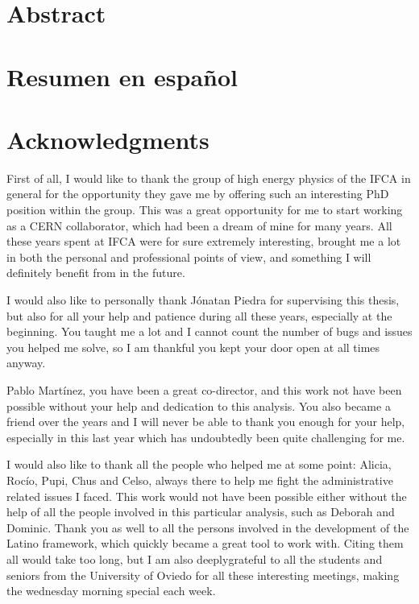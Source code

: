 \documentclass[a4paper, 10pt, openright]{report}
\begin{document}

\setlength{\parskip}{5pt}
\setcounter{page}{1}

\chapter*{\huge{Abstract}}
\newpage
%
\chapter*{\huge{Resumen en espa\~{n}ol}}
\newpage
%

\chapter*{\huge{Acknowledgments}}

\iffalse
First of all, I would like to thank the group of high energy physics of the \ac{IFCA} in general for the opportunity they gave me by offering such an interesting PhD position within the group. This was a great opportunity for me to start working as a CERN collaborator, which had been a dream of mine for many years. All these years spent at \ac{IFCA} were for sure extremely interesting, brought me a lot in both the personal and professional points of view, and something I will definitely benefit from in the future.

I would also like to personally thank J\'{o}natan Piedra for supervising this thesis, but also for all your help and patience during all these years, especially at the beginning. You taught me a lot and I cannot count the number of bugs and issues you helped me solve, so I am thankful you kept your door open at all times anyway.

Pablo Mart\'{i}nez, you have been a great co-director, and this work not have been possible without your help and dedication to this analysis. You also became a friend over the years and I will never be able to thank you enough for your help, especially in this last year which has undoubtedly been quite challenging for me. 

I would also like to thank all the people who helped me at some point: Alicia, Roc\'{i}o, Pupi, Chus and Celso, always there to help me fight the administrative related issues I faced. This work would not have been possible either without the help of all the people involved in this particular analysis, such as Deborah and Dominic. Thank you as well to all the persons involved in the development of the Latino framework, which quickly became a great tool to work with. Citing them all would take too long, but I am also deeplygrateful to all the students and seniors from the University of Oviedo for all these interesting meetings, making the wednesday morning special each week. 
\end{document}
